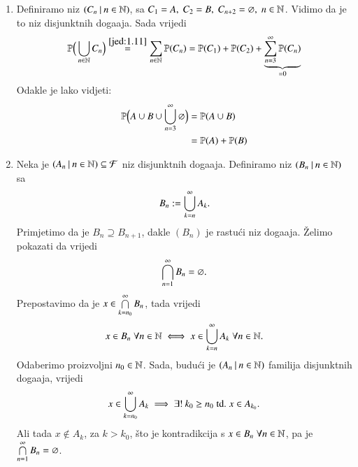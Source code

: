 \begin{rj}[\ref{zad:1.12}]
    \begin{enumerate}[label=(\alph*)]
        \item Definiramo niz $({C_n} \: | \: {n \in \mathbb{N}})$, sa $C_1 = A, \; C_2 = B, \; C_{n + 2} = \varnothing, \; n \in \mathbb{N}$.
            Vidimo da je to niz disjunktnih doga\dj aja.
            Sada vrijedi
            \begin{equation*}
                \mathbb{P} \Big(\bigcup\limits_{n \in \mathbb{N}}^{} C_n \Big) \overset{\eqref{jed:1.11}}{=} \sum\limits_{n \in \mathbb{N}}^{} \mathbb{P}({C_n}) = \mathbb{P}({C_1}) + \mathbb{P}({C_2}) + \underbrace{\sum\limits_{n = 3}^{\infty} \mathbb{P}({C_n})}_{=0}
            \end{equation*}
            Odakle je lako vidjeti:
            \begin{align*}
                \mathbb{P} \Big( A \cup B \cup \bigcup\limits_{n = 3}^{\infty} \varnothing \Big) &= \mathbb{P}({A \cup B}) \\
                &= \mathbb{P}({A}) + \mathbb{P}({B})
            \end{align*}
        \item Neka je $({A_n} \: | \: {n \in \mathbb{N}}) \subseteq \mathcal{F}$ niz disjunktnih doga\dj aja.
        Definiramo niz $({B_n} \: | \: {n \in \mathbb{N}})$ sa
        \begin{equation*}
            B_n := \bigcup\limits_{k = n}^{\infty} A_k.
        \end{equation*}
        Primjetimo da je $B_n \supseteq B_{n + 1}$, dakle $(B_n)$ je rastu\' ci niz doga\dj aja.
        \v Zelimo pokazati da vrijedi
        \begin{equation*}
            \bigcap\limits_{n = 1}^{\infty} B_n = \varnothing.
        \end{equation*}
        Prepostavimo da je $x \in \bigcap\limits_{k = n_0}^{\infty} B_n$, tada vrijedi
        \begin{equation*}
            x \in B_n \; \forall n \in \mathbb{N} \iff x \in \bigcup\limits_{k = n}^{\infty} A_k \; \forall n \in \mathbb{N}.
        \end{equation*}
        Odaberimo proizvoljni $n_0 \in \mathbb{N}$.
        Sada, budu\' ci je $({A_n} \: | \: {n \in \mathbb{N}})$ familija disjunktnih doga\dj aja, vrijedi
        \begin{equation*}
            x \in \bigcup\limits_{k = n_0}^{\infty} A_k \implies \exists ! \: k_0 \geq n_0 \; \mathrm{td.} \; x \in A_{k_0}.
        \end{equation*}
        Ali tada $x \notin A_k$, za $k > k_0$, \v sto je kontradikcija s $x \in B_n \; \forall n \in \mathbb{N}$, pa je $\bigcap\limits_{n = 1}^{\infty} B_n = \varnothing$.\\

\end{enumerate}
\end{rj}
